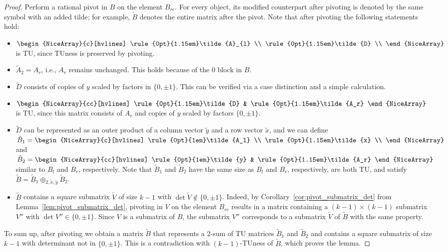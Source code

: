 \documentclass{article}
\theoremstyle{definition}
\begin{document}
\begin{proof}
    Perform a rational pivot in $B$ on the element $B_{rc}$. For every object, its modified counterpart after pivoting is denoted by the same symbol with an added tilde; for example, $\tilde{B}$ denotes the entire matrix after the pivot. Note that after pivoting the following statements hold:
    \begin{itemize}
        \item $\begin{NiceArray}{c}[hvlines] \rule{0pt}{1.15em}\tilde{A}_{l} \\ \rule{0pt}{1.15em}\tilde{D} \\ \end{NiceArray}$ is TU, since TUness is preserved by pivoting.
        \item $\tilde{A}_{2} = A_{r}$, i.e., $A_{r}$ remains unchanged. This holds because of the $0$ block in $B$.
        \item $\tilde{D}$ consists of copies of $y$ scaled by factors in $\{0, \pm 1\}$. This can be verified via a case distinction and a simple calculation.
        \item $\begin{NiceArray}{cc}[hvlines] \rule{0pt}{1.15em}\tilde{D} & \rule{0pt}{1.15em}\tilde{A_r} \end{NiceArray}$ is TU, since this matrix consists of $A_{r}$ and copies of $y$ scaled by factors $\{0, \pm 1\}$.
        \item $\tilde{D}$ can be represented as an outer product of a column vector $\tilde{y}$ and a row vector $\tilde{x}$, and we can define $\tilde{B}_{1} = \begin{NiceArray}{c}[hvlines] \rule{0pt}{1em}\tilde{A_l} \\ \rule{0pt}{1.15em}\tilde{x} \\ \end{NiceArray}$ and $\tilde{B}_{2} =\begin{NiceArray}{cc}[hvlines] \rule{0pt}{1em}\tilde{y} & \rule{0pt}{1.15em}\tilde{A_r} \end{NiceArray}$ similar to $B_{l}$ and $B_{r}$, respectively. Note that $\tilde{B}_{1}$ and $\tilde{B}_{2}$ have the same size as $B_{l}$ and $B_{r}$, respectively, are both TU, and satisfy $\tilde{B} = \tilde{B}_{1} \oplus_{2, \tilde{x}, \tilde{y}} \tilde{B}_{2}$.
        \item $\tilde{B}$ contains a square submatrix $\tilde{V}$ of size $k - 1$ with $\det \tilde{V} \notin \{0, \pm 1\}$. Indeed, by Corollary~\ref{cor:pivot_submatrix_det} from Lemma~\ref{lem:pivot_submatrix_det}, pivoting in $V$ on the element $B_{rc}$ results in a matrix containing a $(k - 1) \times (k - 1)$ submatrix $V''$ with $\det V'' \in \{0, \pm 1\}$. Since $V$ is a submatrix of $B$, the submatrix $V''$ corresponds to a submatrix $\tilde{V}$ of $\tilde{B}$ with the same property.
    \end{itemize}
    To sum up, after pivoting we obtain a matrix $\tilde{B}$ that represents a $2$-sum of TU matrices $\tilde{B}_{1}$ and $\tilde{B}_{2}$ and contains a square submatrix of size $k - 1$ with determinant not in $\{0, \pm 1\}$. This is a contradiction with $(k - 1)$-TUness of $\tilde{B}$, which proves the lemma.
\end{proof}
\end{document}
